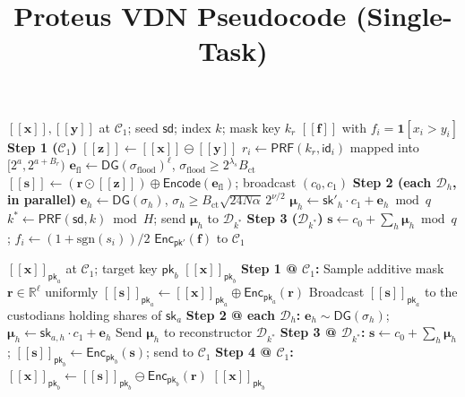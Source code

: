 \documentclass[letterpaper,10pt]{article}
\title{Proteus VDN Pseudocode (Single-Task)}
\author{}
\date{}
\newcommand{\textbt}[1]{\textsf{\textbf{#1}}}
\theoremstyle{remark}
\newcommand{\impc}{\textsf{SPDCmp}\xspace}
\newcommand{\CSO}{\mathcal{C}_1}
\newcommand{\DCe}{\mathcal{D}}
\newcommand{\En}[1]{[\![#1]\!]}
\newcommand{\sgn}{\mathrm{sgn}}
\newcommand{\Br}{B_{r}}
\newcommand{\Bct}{B_{\mathrm{ct}}}
\newcommand{\sflood}{\sigma_{\mathrm{flood}}}
\newcommand{\shh}{\sigma_{h}}
\newcommand{\ls}{\lambda_{s}}
\begin{document}
\maketitle

\begin{algorithm}[t]
\caption{\impc: threshold comparison, encrypted output}
\label{alg:impc}
\small
\begin{algorithmic}[1]
\Require $\En{\mathbf{x}},\En{\mathbf{y}}$ at $\CSO$; seed $\mathsf{sd}$;
         index $k$; mask key $k_r$
\Ensure  $\En{\mathbf{f}}$ with $f_i=\mathbf{1}[x_i>y_i]$
\Statex \textbf{Step 1 ($\CSO$)}
\State $\En{\mathbf{z}}\gets\En{\mathbf{x}}\ominus\En{\mathbf{y}}$
\State $r_i\gets\mathsf{PRF}(k_r,\mathsf{id}_i)$ mapped into
       $[2^{a},2^{a+\Br})$ \Comment{$a{=}80,\Br{=}80$}
\State $\mathbf{e}_{\mathrm{fl}}\gets\mathsf{DG}(\sflood)^{\ell}$,
       $\sflood\ge 2^{\ls}\Bct$
\State $\En{\mathbf{s}}\gets(\mathbf{r}\odot\En{\mathbf{z}})\oplus
       \mathsf{Encode}(\mathbf{e}_{\mathrm{fl}})$; broadcast $(c_0,c_1)$
\Statex \textbf{Step 2 (each $\DCe_h$, in parallel)}
\State $\mathbf{e}_h\gets\mathsf{DG}(\shh)$,
       $\shh\ge \Bct\sqrt{24N\alpha}\,2^{\nu/2}$ 
\State $\boldsymbol{\mu}_h\gets\mathsf{sk}'_h\cdot c_1+\mathbf{e}_h \bmod q$
\State $k^{*}\gets\mathsf{PRF}(\mathsf{sd},k)\bmod H$; send
       $\boldsymbol{\mu}_h$ to $\DCe_{k^{*}}$
\Statex \textbf{Step 3 ($\DCe_{k^{*}}$)}
\State $\mathbf{s}\gets c_0+\sum_h\boldsymbol{\mu}_h \bmod q$;
       $f_i\gets(1+\sgn(s_i))/2$
\State \Return $\mathsf{Enc}_{\mathsf{pk}'}(\mathbf{f})$ to $\CSO$
\end{algorithmic}
\end{algorithm}

\begin{algorithm}[t]
\caption{\textbt{SEDTP}: Secure Encrypted-Domain Transform}
\label{alg:sedtp}
\small
\begin{algorithmic}[1]
\Require $\En{\mathbf{x}}_{\mathsf{pk}_a}$ at $\CSO$; target key
$\mathsf{pk}_b$
\Ensure $\En{\mathbf{x}}_{\mathsf{pk}_b}$
\Statex \textbf{Step 1 @ $\CSO$:}
\State Sample additive mask $\mathbf{r}\in\mathbb{R}^\ell$ uniformly
\State $\En{\mathbf{s}}_{\mathsf{pk}_a}
\leftarrow \En{\mathbf{x}}_{\mathsf{pk}_a} \oplus
\mathsf{Enc}_{\mathsf{pk}_a}(\mathbf{r})$
\State Broadcast $\En{\mathbf{s}}_{\mathsf{pk}_a}$ to the custodians
holding shares of $\mathsf{sk}_a$
\Statex \textbf{Step 2 @ each $\DCe_h$:}
\State $\mathbf{e}_h \sim \mathsf{DG}(\shh)$;
$\boldsymbol{\mu}_h \leftarrow \mathsf{sk}_{a,h}\cdot c_1 + \mathbf{e}_h$
\State Send $\boldsymbol{\mu}_h$ to reconstructor $\DCe_{k^*}$
\Statex \textbf{Step 3 @ $\DCe_{k^*}$:}
\State $\mathbf{s} \leftarrow c_0 + \sum_h \boldsymbol{\mu}_h$;
$\En{\mathbf{s}}_{\mathsf{pk}_b}\leftarrow
\mathsf{Enc}_{\mathsf{pk}_b}(\mathbf{s})$; send to $\CSO$
\Statex \textbf{Step 4 @ $\CSO$:}
\State $\En{\mathbf{x}}_{\mathsf{pk}_b}
\leftarrow \En{\mathbf{s}}_{\mathsf{pk}_b}
\ominus \mathsf{Enc}_{\mathsf{pk}_b}(\mathbf{r})$
\State \Return $\En{\mathbf{x}}_{\mathsf{pk}_b}$
\end{algorithmic}
\end{algorithm}
\end{document}
